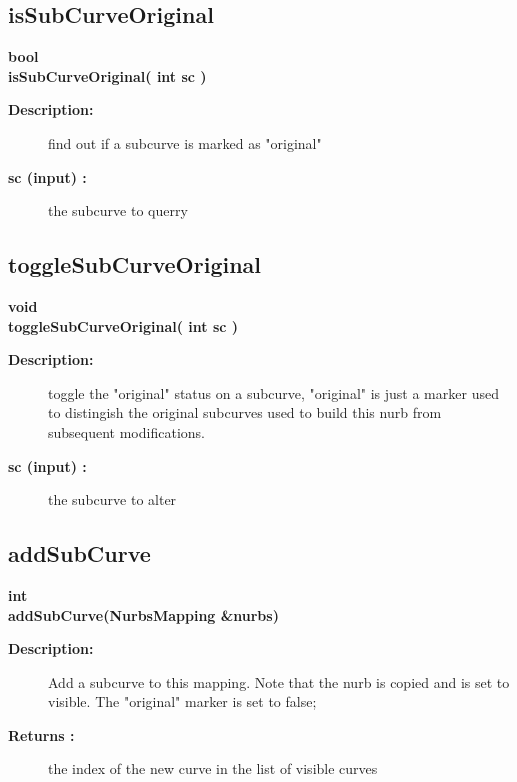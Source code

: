 \subsection{isSubCurveOriginal}
 
\begin{flushleft} \textbf{%
bool  \\ 
\settowidth{\NurbsMappingIncludeArgIndent}{isSubCurveOriginal(}%
isSubCurveOriginal( int sc )
}\end{flushleft}
\begin{description}
\item[{\bf Description:}] 
   find out if a subcurve is marked as "original"
\item[{\bf sc (input) :}]  the subcurve to querry
\end{description}
\subsection{toggleSubCurveOriginal}
 
\begin{flushleft} \textbf{%
void  \\ 
\settowidth{\NurbsMappingIncludeArgIndent}{toggleSubCurveOriginal(}%
toggleSubCurveOriginal( int sc )
}\end{flushleft}
\begin{description}
\item[{\bf Description:}] 
   toggle the "original" status on a subcurve, "original" is just a marker
   used to distingish the original subcurves used to build this nurb from 
   subsequent modifications.
\item[{\bf sc (input) :}]  the subcurve to alter
\end{description}
\subsection{addSubCurve}
 
\begin{flushleft} \textbf{%
int  \\ 
\settowidth{\NurbsMappingIncludeArgIndent}{addSubCurve(}%
addSubCurve(NurbsMapping \&nurbs)
}\end{flushleft}
\begin{description}
\item[{\bf Description:}] 
   Add a subcurve to this mapping.  Note that the nurb is copied and is 
  set to visible.  The "original" marker is set to false;
\item[{\bf Returns :}]  the index of the new curve in the list of visible curves
\end{description}

